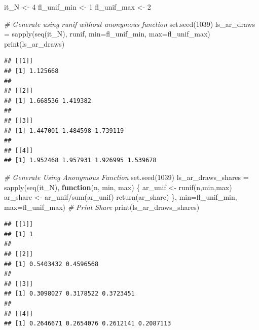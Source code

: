 \documentclass[
]{book}
\newenvironment{Shaded}{\begin{snugshade}}{\end{snugshade}}
\newcommand{\AttributeTok}[1]{\textcolor[rgb]{0.77,0.63,0.00}{#1}}
\newcommand{\CommentTok}[1]{\textcolor[rgb]{0.56,0.35,0.01}{\textit{#1}}}
\newcommand{\ControlFlowTok}[1]{\textcolor[rgb]{0.13,0.29,0.53}{\textbf{#1}}}
\newcommand{\DecValTok}[1]{\textcolor[rgb]{0.00,0.00,0.81}{#1}}
\newcommand{\FunctionTok}[1]{\textcolor[rgb]{0.00,0.00,0.00}{#1}}
\newcommand{\NormalTok}[1]{#1}
\newcommand{\OtherTok}[1]{\textcolor[rgb]{0.56,0.35,0.01}{#1}}
\newcommand{\SpecialCharTok}[1]{\textcolor[rgb]{0.00,0.00,0.00}{#1}}
\begin{document}
\begin{Shaded}
\begin{Highlighting}[]
\NormalTok{it\_N }\OtherTok{\textless{}{-}} \DecValTok{4}
\NormalTok{fl\_unif\_min }\OtherTok{\textless{}{-}} \DecValTok{1}
\NormalTok{fl\_unif\_max }\OtherTok{\textless{}{-}} \DecValTok{2}

\CommentTok{\# Generate using runif without anonymous function}
\FunctionTok{set.seed}\NormalTok{(}\DecValTok{1039}\NormalTok{)}
\NormalTok{ls\_ar\_draws }\OtherTok{=} \FunctionTok{sapply}\NormalTok{(}\FunctionTok{seq}\NormalTok{(it\_N),}
\NormalTok{                     runif,}
                     \AttributeTok{min=}\NormalTok{fl\_unif\_min, }\AttributeTok{max=}\NormalTok{fl\_unif\_max)}
\FunctionTok{print}\NormalTok{(ls\_ar\_draws)}
\end{Highlighting}
\end{Shaded}

\begin{verbatim}
## [[1]]
## [1] 1.125668
## 
## [[2]]
## [1] 1.668536 1.419382
## 
## [[3]]
## [1] 1.447001 1.484598 1.739119
## 
## [[4]]
## [1] 1.952468 1.957931 1.926995 1.539678
\end{verbatim}

\begin{Shaded}
\begin{Highlighting}[]
\CommentTok{\# Generate Using Anonymous Function}
\FunctionTok{set.seed}\NormalTok{(}\DecValTok{1039}\NormalTok{)}
\NormalTok{ls\_ar\_draws\_shares }\OtherTok{=} \FunctionTok{sapply}\NormalTok{(}\FunctionTok{seq}\NormalTok{(it\_N),}
                            \ControlFlowTok{function}\NormalTok{(n, min, max) \{}
\NormalTok{                              ar\_unif }\OtherTok{\textless{}{-}} \FunctionTok{runif}\NormalTok{(n,min,max)}
\NormalTok{                              ar\_share }\OtherTok{\textless{}{-}}\NormalTok{ ar\_unif}\SpecialCharTok{/}\FunctionTok{sum}\NormalTok{(ar\_unif)}
                              \FunctionTok{return}\NormalTok{(ar\_share)}
\NormalTok{                            \},}
                            \AttributeTok{min=}\NormalTok{fl\_unif\_min, }\AttributeTok{max=}\NormalTok{fl\_unif\_max)}
\CommentTok{\# Print Share}
\FunctionTok{print}\NormalTok{(ls\_ar\_draws\_shares)}
\end{Highlighting}
\end{Shaded}

\begin{verbatim}
## [[1]]
## [1] 1
## 
## [[2]]
## [1] 0.5403432 0.4596568
## 
## [[3]]
## [1] 0.3098027 0.3178522 0.3723451
## 
## [[4]]
## [1] 0.2646671 0.2654076 0.2612141 0.2087113
\end{verbatim}
\end{document}
